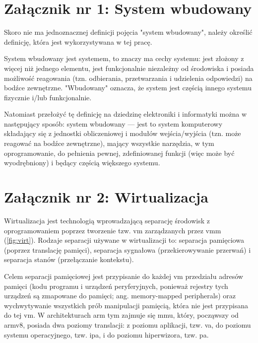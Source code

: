 \documentclass[../main]{subfiles}
\begin{document}
\section*{Załącznik nr 1: System wbudowany}\label{sec:zalacznik-1}

Skoro nie ma jednoznacznej definicji pojęcia "system wbudowany", należy określić definicję, która jest wykorzystywana w tej pracę.

System wbudowany jest systemem, to znaczy ma cechy systemu: jest złożony z więcej niż jednego elementu, jest funkcjonalnie niezależny od środowiska i posiada możliwość reagowania (tzn. odbierania, przetwarzania i udzielenia odpowiedzi) na bodźce zewnętrzne. "Wbudowany" oznacza, że system jest częścią innego systemu fizycznie i/lub funkcjonalnie.

Natomiast przełożyć tę definicję na dziedzinę elektroniki i informatyki można w następujący sposób: system wbudowany — jest to system komputerowy składający się z jednostki obliczeniowej i modułów wejścia/wyjścia (tzn. może reagować na bodźce zewnętrzne), mający wszystkie narzędzia, w tym oprogramowanie, do pełnienia pewnej, zdefiniowanej funkcji (więc może być wyodrębniony) i będący częścią większego systemu.

\section*{Załącznik nr 2: Wirtualizacja}\label{sec:zalacznik-2}

Wirtualizacja jest technologią wprowadzającą separację środowisk z oprogramowaniem poprzez tworzenie tzw. \gls{vm} zarządzanych przez \gls{vmm} (\cref{fig:virt}). Rodzaje separacji używane w wirtualizacji to: separacja pamięciowa (poprzez translację pamięci), separacja sygnałowa (przekierowywanie przerwań) i separacja stanów (przełączanie kontekstu).

Celem separacji pamięciowej jest przypisanie do każdej \gls{vm} przedziału adresów pamięci (kodu programu i urządzeń peryferyjnych, ponieważ rejestry tych urządzeń są zmapowane do pamięci; ang. memory-mapped peripherals) oraz wychwytywanie wszystkich prób manipulacji pamięcią, która nie jest przypisana do tej \gls{vm}. W architekturach \gls{arm} tym zajmuje się \gls{mmu}, który, począwszy od \gls{arm}v8, posiada dwa poziomy translacji: z poziomu aplikacji, tzw. \gls{va}, do poziomu systemu operacyjnego, tzw. \gls{ipa}, i do poziomu hiperwizora, tzw. \gls{pa}.
\end{document}
